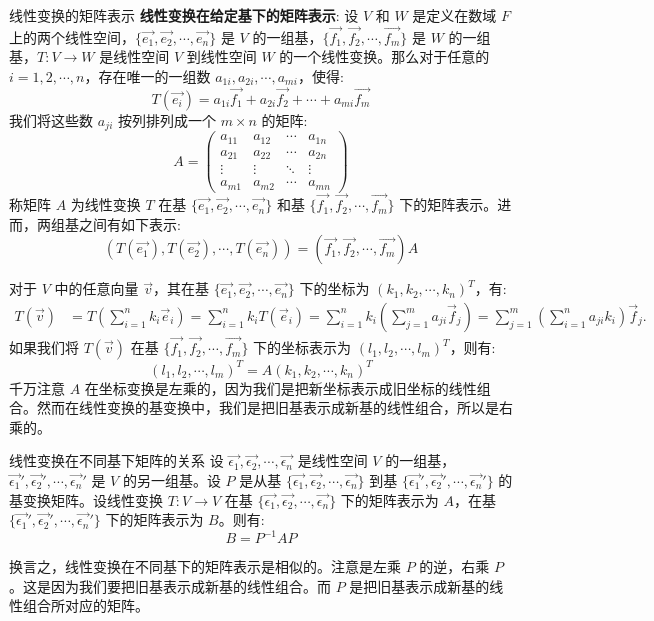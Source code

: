 \documentclass[a4paper,12pt]{ctexart}
\begin{document}
\begin{mythm}{线性变换的矩阵表示}{}
    \textbf{线性变换在给定基下的矩阵表示}: 设 $V$ 和 $W$ 是定义在数域 $F$ 上的两个线性空间，$\{\vec{e_1}, \vec{e_2}, \cdots, \vec{e_n}\}$ 是 $V$ 的一组基，$\{\vec{f_1}, \vec{f_2}, \cdots, \vec{f_m}\}$ 是 $W$ 的一组基，$T: V \to W$ 是线性空间 $V$ 到线性空间 $W$ 的一个线性变换。那么对于任意的 $i = 1, 2, \cdots, n$，存在唯一的一组数 $a_{1i}, a_{2i}, \cdots, a_{mi}$，使得:
    \[
    T(\vec{e_i}) = a_{1i} \vec{f_1} + a_{2i} \vec{f_2} + \cdots + a_{mi} \vec{f_m}
    \]
    我们将这些数 $a_{ji}$ 按列排列成一个 $m \times n$ 的矩阵:
    \[
    A = \begin{pmatrix}
    a_{11} & a_{12} & \cdots & a_{1n} \\
    a_{21} & a_{22} & \cdots & a_{2n} \\
    \vdots & \vdots & \ddots & \vdots \\
    a_{m1} & a_{m2} & \cdots & a_{mn}
    \end{pmatrix}
    \]
    称矩阵 $A$ 为线性变换 $T$ 在基 $\{\vec{e_1}, \vec{e_2}, \cdots, \vec{e_n}\}$ 和基 $\{\vec{f_1}, \vec{f_2}, \cdots, \vec{f_m}\}$ 下的矩阵表示。进而，两组基之间有如下表示:
    \[
    (T(\vec{e_1}), T(\vec{e_2}), \cdots, T(\vec{e_n})) = (\vec{f_1}, \vec{f_2}, \cdots, \vec{f_m}) A
    \]
    
    对于 $V$ 中的任意向量 $\vec{v}$，其在基 $\{\vec{e_1}, \vec{e_2}, \cdots, \vec{e_n}\}$ 下的坐标为 $(k_1, k_2, \cdots, k_n)^T$，有:
    \[
    \begin{aligned}
    T(\vec{v}) &= T\left( \sum_{i=1}^n k_i \vec{e}_i \right)
    = \sum_{i=1}^n k_i T(\vec{e}_i)
    = \sum_{i=1}^n k_i \left( \sum_{j=1}^m a_{ji} \vec{f}_j \right) 
    = \sum_{j=1}^m \left( \sum_{i=1}^n a_{ji} k_i \right) \vec{f}_j.
    \end{aligned}
    \]
    如果我们将 $T(\vec{v})$ 在基 $\{\vec{f_1}, \vec{f_2}, \cdots, \vec{f_m}\}$ 下的坐标表示为 $(l_1, l_2, \cdots, l_m)^T$，则有:
    \[
    (l_1, l_2, \cdots, l_m)^T = A (k_1, k_2, \cdots, k_n)^T
    \]
    千万注意 $A$ 在坐标变换是左乘的，因为我们是把新坐标表示成旧坐标的线性组合。然而在线性变换的基变换中，我们是把旧基表示成新基的线性组合，所以是右乘的。
\end{mythm}

\newpage

\begin{mythm}{线性变换在不同基下矩阵的关系}{}
    设 $\vec{\epsilon_1}, \vec{\epsilon_2}, \cdots, \vec{\epsilon_n}$ 是线性空间 $V$ 的一组基，$\vec{\epsilon_1}', \vec{\epsilon_2}', \cdots, \vec{\epsilon_n}'$ 是 $V$ 的另一组基。设 $P$ 是从基 $\{\vec{\epsilon_1}, \vec{\epsilon_2}, \cdots, \vec{\epsilon_n}\}$ 到基 $\{\vec{\epsilon_1}', \vec{\epsilon_2}', \cdots, \vec{\epsilon_n}'\}$ 的基变换矩阵。设线性变换 $T: V \to V$ 在基 $\{\vec{\epsilon_1}, \vec{\epsilon_2}, \cdots, \vec{\epsilon_n}\}$ 下的矩阵表示为 $A$，在基 $\{\vec{\epsilon_1}', \vec{\epsilon_2}', \cdots, \vec{\epsilon_n}'\}$ 下的矩阵表示为 $B$。则有:
    \[
    B = P^{-1} A P
    \]
    
    换言之，线性变换在不同基下的矩阵表示是相似的。注意是左乘 $P$ 的逆，右乘 $P$。这是因为我们要把旧基表示成新基的线性组合。而 $P$ 是把旧基表示成新基的线性组合所对应的矩阵。
\end{mythm}
\end{document}
